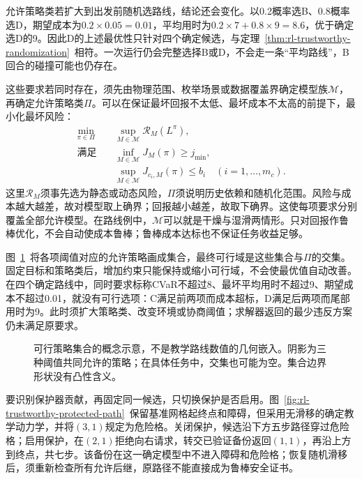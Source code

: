 允许策略类若扩大到出发前随机选路线，结论还会变化。以0.2概率选B、0.8概率选D，期望成本为$0.2\times0.05=0.01$，平均用时为$0.2\times7+0.8\times9=8.6$，优于确定选D的9。因此D的上述最优性只针对四个确定候选，与定理~\ref{thm:rl-trustworthy-randomization}~相符。一次运行仍会完整选择B或D，不会走一条“平均路线”，B回合的碰撞可能也仍存在。

这些要求若同时存在，须先由物理范围、枚举场景或数据覆盖界确定模型族$\mathcal M$，再确定允许策略类$\Pi$。可以在保证最坏回报不太低、最坏成本不太高的前提下，最小化最坏风险：
\begin{align}
  \min_{\pi\in\Pi}\quad&
      \sup_{M\in\mathcal M}\mathcal R_M(L^\pi), \nonumber\\
  \text{满足}\quad&
      \inf_{M\in\mathcal M}J_M(\pi)\geq j_{\min}, \nonumber\\
  &\sup_{M\in\mathcal M}J_{c_i,M}(\pi)\leq b_i
       \quad (i=1,\ldots,m_c).
  \label{eq:rl-trustworthy-combined-problem}
\end{align}
这里$\mathcal R_M$须事先选为静态或动态风险，$\Pi$须说明历史依赖和随机化范围。风险与成本越大越差，故对模型取上确界；回报越小越差，故取下确界。这使每项要求分别覆盖全部允许模型。在路线例中，$\mathcal M$可以就是干燥与湿滑两情形。只对回报作鲁棒优化，不会自动使成本鲁棒；鲁棒成本达标也不保证任务收益足够。

图~\ref{fig:rl-trustworthy-intersection}~将各项阈值对应的允许策略画成集合，最终可行域是这些集合与$\Pi$的交集。固定目标和策略类后，增加约束只能保持或缩小可行域，不会使最优值自动改善。在四个确定路线中，同时要求标称CVaR不超过8、最坏平均用时不超过9、期望成本不超过0.01，就没有可行选项：C满足前两项而成本超标，D满足后两项而尾部用时为9。此时须扩大策略类、改变环境或协商阈值；求解器返回的最少违反方案仍未满足原要求。

\begin{figure}[htbp]
  \centering
  
  \caption{可行策略集合的概念示意，不是教学路线数值的几何嵌入。阴影为三种阈值共同允许的策略；在具体任务中，交集也可能为空。集合边界形状没有凸性含义。}
  \label{fig:rl-trustworthy-intersection}
\end{figure}

要识别保护器贡献，再固定同一候选，只切换保护是否启用。图~\ref{fig:rl-trustworthy-protected-path}~保留基准网格起终点和障碍，但采用无滑移的确定教学动力学，并将$(3,1)$规定为危险格。关闭保护，候选沿下方五步路径穿过危险格；启用保护，在$(2,1)$拒绝向右请求，转交已验证备份返回$(1,1)$，再沿上方到终点，共七步。该备份在这一确定模型中不进入障碍和危险格；恢复随机滑移后，须重新检查所有允许后继，原路径不能直接成为鲁棒安全证书。

